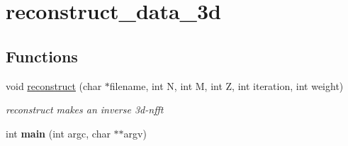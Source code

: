 \hypertarget{group__applications__mri3d__reconstruct__data__3d}{
\section{reconstruct\_\-data\_\-3d}
\label{group__applications__mri3d__reconstruct__data__3d}
}
\subsection*{Functions}
\begin{CompactItemize}
\item 
\hypertarget{group__applications__mri3d__reconstruct__data__3d_ga0}{
void \hyperlink{group__applications__mri3d__reconstruct__data__3d_ga0}{reconstruct} (char $\ast$filename, int N, int M, int Z, int iteration, int weight)}
\label{group__applications__mri3d__reconstruct__data__3d_ga0}

\begin{CompactList}\small\item\em reconstruct makes an inverse 3d-nfft \item\end{CompactList}\item 
\hypertarget{group__applications__mri3d__reconstruct__data__3d_ga1}{
int {\bf main} (int argc, char $\ast$$\ast$argv)}
\label{group__applications__mri3d__reconstruct__data__3d_ga1}

\end{CompactItemize}
